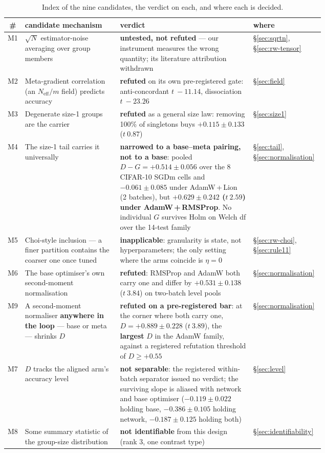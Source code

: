 \documentclass[10pt,letterpaper]{article}
\newcommand{\Dstat}{D}                         %
\newcommand{\Gstat}{G}                         %
\begin{document}
\begin{table}[htbp]
\centering
\footnotesize
\caption{Index of the nine candidates, the verdict on each, and where each is decided.}
\label{tab:mechanisms}
\begin{tabular}{@{}cp{0.30\linewidth}p{0.42\linewidth}l@{}}
\toprule
\# & candidate mechanism & verdict & where \\
\midrule
M1 & $\sqrt{N}$ estimator-noise averaging over group members &
  \textbf{untested, not refuted} --- our instrument measures the wrong quantity; its literature
  attribution withdrawn & \S\ref{sec:sqrtn}, \S\ref{sec:rw-tensor} \\
M2 & Meta-gradient correlation (an $N_{\mathrm{eff}}/m$ field) predicts accuracy &
  \textbf{refuted} on its own pre-registered gate: anti-concordant $t\ -11.14$, dissociation
  $t\ -23.26$ & \S\ref{sec:field} \\
M3 & Degenerate size-1 groups are the carrier &
  \textbf{refuted} as a general size law: removing 100\% of singletons buys
  $+0.115 \pm 0.133$ ($t\ 0.87$) & \S\ref{sec:size1} \\
M4 & The size-1 tail carries it universally &
  \textbf{narrowed to a base--meta pairing, not to a base}: pooled
  $\Dstat - \Gstat = +0.514 \pm 0.056$ over the 8 CIFAR-10
  SGDm cells and $-0.061 \pm 0.085$ under AdamW\,+\,Lion (2 batches), but
  \textbf{$+0.629 \pm 0.242$ ($t\ 2.59$) under AdamW\,+\,RMSProp}. No individual $\Gstat$
  survives Holm on Welch df over the 14-test family & \S\ref{sec:tail},
  \S\ref{sec:normalisation} \\
M5 & Choi-style inclusion --- a finer partition contains the coarser one once tuned &
  \textbf{inapplicable}: granularity is state, not hyperparameters; the only setting where the
  arms coincide is $\eta = 0$ & \S\ref{sec:rw-choi}, \S\ref{sec:rule11} \\
M6 & The base optimiser's own second-moment normalisation &
  \textbf{refuted}: RMSProp and AdamW both carry one and differ by $+0.531 \pm 0.138$
  ($t\ 3.84$) on two-batch level pools & \S\ref{sec:normalisation} \\
M9 & A second-moment normaliser \textbf{anywhere in the loop} --- base or meta --- shrinks
  $\Dstat$ &
  \textbf{refuted on a pre-registered bar}: at the corner where both carry one,
  $\Dstat = +0.889 \pm 0.228$ ($t\ 3.89$), the \textbf{largest} $\Dstat$ in the AdamW family,
  against a registered refutation threshold of $\Dstat \ge +0.55$ & \S\ref{sec:normalisation} \\
M7 & $\Dstat$ tracks the aligned arm's accuracy level &
  \textbf{not separable}: the registered within-batch separator issued no verdict; the surviving
  slope is aliased with network and base optimiser ($-0.119 \pm 0.022$ holding base,
  $-0.386 \pm 0.105$ holding network, $-0.187 \pm 0.125$ holding both) & \S\ref{sec:level} \\
M8 & Some summary statistic of the group-size distribution &
  \textbf{not identifiable} from this design (rank 3, one contrast type) &
  \S\ref{sec:identifiability} \\
\bottomrule
\end{tabular}
\end{table}
\end{document}
